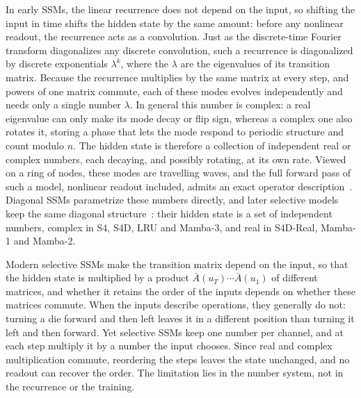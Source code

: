 \documentclass[aps,prx,reprint,superscriptaddress,longbibliography,nofootinbib,floatfix]{revtex4-2}
\theoremstyle{plain}
\theoremstyle{definition}
\begin{document}
In early SSMs, the linear recurrence does not depend on the input, so
shifting the input in time shifts the hidden state by the same amount:
before any nonlinear readout, the recurrence acts as a convolution. Just
as the discrete-time Fourier transform diagonalizes any discrete
convolution, such a recurrence is diagonalized by discrete exponentials
$\lambda^k$, where the $\lambda$ are the eigenvalues of its transition
matrix. Because the recurrence multiplies by the same matrix at every
step, and powers of one matrix commute, each of these modes evolves
independently and needs only a single number $\lambda$. In general this
number is complex: a real eigenvalue can only make its mode decay or flip
sign, whereas a complex one also rotates it, storing a phase that lets
the mode respond to periodic structure and count modulo $n$. The hidden
state is therefore a collection of independent real or complex numbers,
each decaying, and possibly rotating, at its own rate. Viewed on a ring of
nodes, these modes are travelling waves, and the full forward pass of such
a model, nonlinear readout included, admits an exact operator
description~\cite{Shikder2026oscillator}. Diagonal SSMs parametrize these
numbers directly, and later selective models keep the same diagonal
structure~\cite{gu_s4,gu_s4d,orvieto_lru,gu_mamba,mamba3}: their hidden
state is a set of independent numbers, complex in S4, S4D, LRU and
Mamba-3, and real in S4D-Real, Mamba-1 and Mamba-2.

Modern selective SSMs make the transition matrix depend on the input, so that the hidden state is multiplied by a product
$\bar{A}(u_T)\cdots\bar{A}(u_1)$ of different matrices, and whether it retains the order of the inputs depends on whether these matrices commute. When the inputs describe operations, they generally do not: turning a die forward and then left leaves it in a different position than turning it left and then forward. Yet selective SSMs keep one number per channel, and at each step multiply it by a number the input chooses. Since real and complex multiplication commute, reordering the steps leaves the state unchanged, and no readout can recover the order. The limitation lies in the number system, not in the recurrence or the training.
\end{document}
